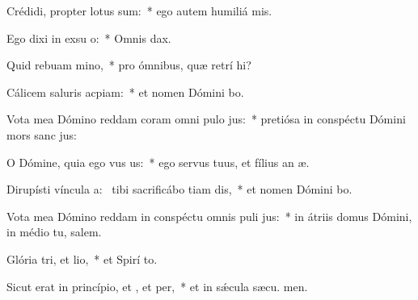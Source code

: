 \item Crédidi, propter  lotus sum:~* ego autem humiliá  mis.
\item Ego dixi in exsu o:~* Omnis  dax.
\item Quid rebuam mino,~* pro ómnibus, quæ retrí hi?
\item Cálicem saluris acpiam:~* et nomen Dómini bo.
\item Vota mea Dómino reddam coram omni pulo jus:~* pretiósa in conspéctu Dómini mors sanc jus:
\item O Dómine, quia ego vus us:~* ego servus tuus, et fílius an æ.
\item Dirupísti víncula a:~\pscross{} tibi sacrificábo tiam dis,~* et nomen Dómini bo.
\item Vota mea Dómino reddam in conspéctu omnis puli jus:~* in átriis domus Dómini, in médio tu, salem.
\item Glória tri, et lio,~* et Spirí to.
\item Sicut erat in princípio, et , et per,~* et in sǽcula sæcu. men.
